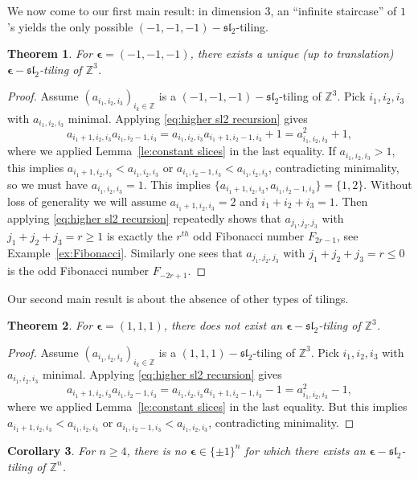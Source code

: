 \documentclass{amsart}
\newtheorem{theorem}{Theorem}
\newtheorem{corollary}[theorem]{Corollary}
\newcommand{\bepsilon}{\boldsymbol{\epsilon}}
\newcommand{\fsl}{\mathfrak{sl}}
\newcommand{\ZZ}{\mathbb{Z}}
\begin{document}
    We now come to our first main result: in dimension $3$, an ``infinite staircase'' of $1$'s yields the only possible $(-1,-1,-1)-\fsl_2$-tiling.

    \begin{theorem}
      For $\bepsilon=(-1,-1,-1)$, there exists a unique (up to translation) $\bepsilon-\fsl_2$-tiling of $\ZZ^3$.
    \end{theorem}
    \begin{proof}
      Assume $(a_{i_1,i_2,i_3})_{i_k\in\ZZ}$ is a $(-1,-1,-1)-\fsl_2$-tiling of $\ZZ^3$.  Pick $i_1,i_2,i_3$ with $a_{i_1,i_2,i_3}$ minimal.  Applying \eqref{eq:higher sl2 recursion} gives
      \[a_{i_1+1,i_2,i_3}a_{i_1,i_2-1,i_3}=a_{i_1,i_2,i_3}a_{i_1+1,i_2-1,i_3}+1=a_{i_1,i_2,i_3}^2+1,\]
      where we applied Lemma~\ref{le:constant slices} in the last equality.  If $a_{i_1,i_2,i_3}>1$, this implies $a_{i_1+1,i_2,i_3}<a_{i_1,i_2,i_3}$ or $a_{i_1,i_2-1,i_3}<a_{i_1,i_2,i_3}$, contradicting minimality, so we must have $a_{i_1,i_2,i_3}=1$.  This implies $\{a_{i_1+1,i_2,i_3},a_{i_1,i_2-1,i_3}\}=\{1,2\}$.  Without loss of generality we will assume $a_{i_1+1,i_2,i_3}=2$ and $i_1+i_2+i_3=1$.  Then applying \eqref{eq:higher sl2 recursion} repeatedly shows that $a_{j_1,j_2,j_3}$ with $j_1+j_2+j_3=r\ge1$ is exactly the $r^{th}$ odd Fibonacci number $F_{2r-1}$, see Example~\ref{ex:Fibonacci}.  Similarly one sees that $a_{j_1,j_2,j_3}$ with $j_1+j_2+j_3=r\le0$ is the odd Fibonacci number $F_{-2r+1}$.
    \end{proof}

Our second main result is about the absence of other types of tilings.

    \begin{theorem}\label{th:nonexistence}
      For $\bepsilon=(1,1,1)$, there does not exist an $\bepsilon-\fsl_2$-tiling of $\ZZ^3$.
    \end{theorem}
    \begin{proof}
      Assume $(a_{i_1,i_2,i_3})_{i_k\in\ZZ}$ is a $(1,1,1)-\fsl_2$-tiling of $\ZZ^3$.  Pick $i_1,i_2,i_3$ with $a_{i_1,i_2,i_3}$ minimal.  Applying \eqref{eq:higher sl2 recursion} gives
      \[a_{i_1+1,i_2,i_3}a_{i_1,i_2-1,i_3}=a_{i_1,i_2,i_3}a_{i_1+1,i_2-1,i_3}-1=a_{i_1,i_2,i_3}^2-1,\]
      where we applied Lemma~\ref{le:constant slices} in the last equality.  But this implies $a_{i_1+1,i_2,i_3}<a_{i_1,i_2,i_3}$ or $a_{i_1,i_2-1,i_3}<a_{i_1,i_2,i_3}$, contradicting minimality.
    \end{proof}

    \begin{corollary}
      For $n\ge4$, there is no $\bepsilon\in\{\pm1\}^n$ for which there exists an $\bepsilon-\fsl_2$-tiling of $\ZZ^n$.
    \end{corollary}    
\end{document}
